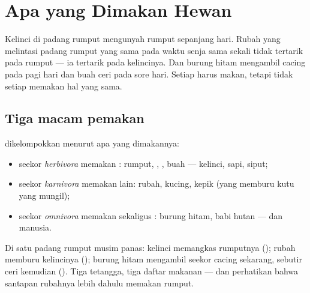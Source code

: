 \chapter{Apa yang Dimakan Hewan}\label{ch:g2:what-animals-eat}

Kelinci di padang rumput mengunyah rumput sepanjang hari. Rubah yang
melintasi padang rumput yang sama pada waktu senja sama sekali tidak
tertarik pada rumput --- ia tertarik pada kelincinya. Dan burung hitam
mengambil cacing pada pagi hari dan buah ceri pada sore hari. Setiap
 harus makan, tetapi tidak setiap  memakan hal yang sama.

\section{Tiga macam pemakan}

\begin{definition}\label{def:g2:what-animals-eat:kinds}
 dikelompokkan menurut apa yang dimakannya:
\begin{itemize}
  \item seekor \emph{herbivora} memakan :
        rumput, , , buah --- kelinci, sapi, siput;
  \item seekor \emph{karnivora} memakan  lain:
        rubah, kucing, kepik (yang memburu kutu  yang mungil);
  \item seekor \emph{omnivora} memakan 
        sekaligus : burung hitam, babi hutan --- dan manusia.
\end{itemize}
\end{definition}

\begin{example}\label{ex:g2:what-animals-eat:meadow}
Di satu padang rumput musim panas: kelinci memangkas rumputnya
(); rubah memburu kelincinya (); burung hitam
mengambil seekor cacing sekarang, sebutir ceri kemudian ().
Tiga tetangga, tiga daftar makanan --- dan perhatikan bahwa santapan
rubahnya lebih dahulu memakan rumput.
\end{example}

